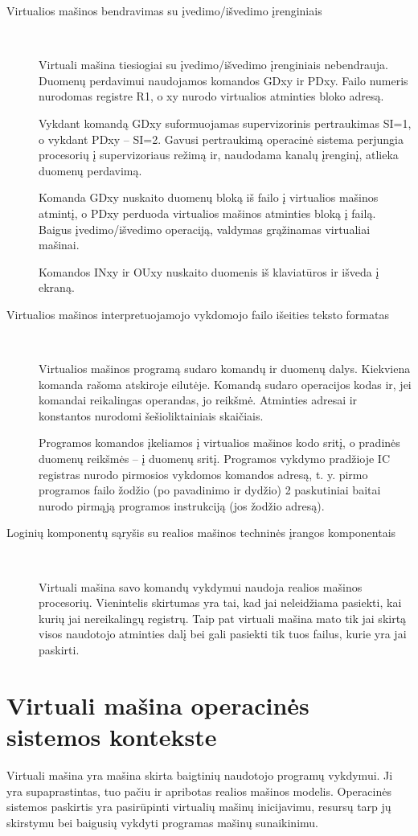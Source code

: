 \begin{description}
\item[Virtualios mašinos bendravimas su įvedimo/išvedimo įrenginiais] \ 

Virtuali mašina tiesiogiai su įvedimo/išvedimo įrenginiais nebendrauja.
Duomenų perdavimui naudojamos komandos GDxy ir PDxy. Failo numeris
nurodomas registre R1, o xy nurodo virtualios atminties bloko adresą.

Vykdant komandą GDxy suformuojamas supervizorinis pertraukimas
SI=1, o vykdant PDxy -- SI=2. Gavusi pertraukimą operacinė sistema
perjungia procesorių į supervizoriaus režimą ir, naudodama kanalų
įrenginį, atlieka duomenų perdavimą.

Komanda GDxy nuskaito duomenų bloką iš failo į virtualios mašinos
atmintį, o PDxy perduoda virtualios mašinos atminties bloką į failą.
Baigus įvedimo/išvedimo operaciją, valdymas grąžinamas virtualiai mašinai.

Komandos INxy ir OUxy nuskaito duomenis iš klaviatūros ir išveda į ekraną.
\end{description}

\begin{description}
\item[Virtualios mašinos interpretuojamojo vykdomojo failo išeities 
teksto formatas] \ 

Virtualios mašinos programą sudaro komandų ir duomenų dalys. Kiekviena
komanda rašoma atskiroje eilutėje. Komandą sudaro operacijos kodas ir,
jei komandai reikalingas operandas, jo reikšmė. Atminties adresai ir
konstantos nurodomi šešioliktainiais skaičiais.

Programos komandos įkeliamos į virtualios mašinos kodo sritį, o pradinės
duomenų reikšmės -- į duomenų sritį. Programos vykdymo pradžioje IC
registras nurodo pirmosios vykdomos komandos adresą, t. y. pirmo programos failo žodžio (po pavadinimo ir dydžio) 2 paskutiniai baitai nurodo pirmąją programos instrukciją (jos žodžio adresą).
\end{description}

\begin{description}
\item[Loginių komponentų sąryšis su realios mašinos techninės įrangos komponentais] \ 

Virtuali mašina savo komandų vykdymui naudoja realios mašinos procesorių.
Vienintelis skirtumas yra tai, kad jai neleidžiama pasiekti, kai kurių
jai nereikalingų registrų. Taip pat virtuali mašina mato tik jai skirtą
visos naudotojo atminties dalį bei gali pasiekti tik tuos failus, kurie
yra jai paskirti.
\end{description}

\section{Virtuali mašina operacinės sistemos kontekste}
Virtuali mašina yra mašina skirta baigtinių naudotojo programų vykdymui. Ji
yra supaprastintas, tuo pačiu ir apribotas realios mašinos modelis. 
Operacinės sistemos paskirtis yra pasirūpinti virtualių mašinų inicijavimu,
resursų tarp jų skirstymu bei baigusių vykdyti programas mašinų 
sunaikinimu.
